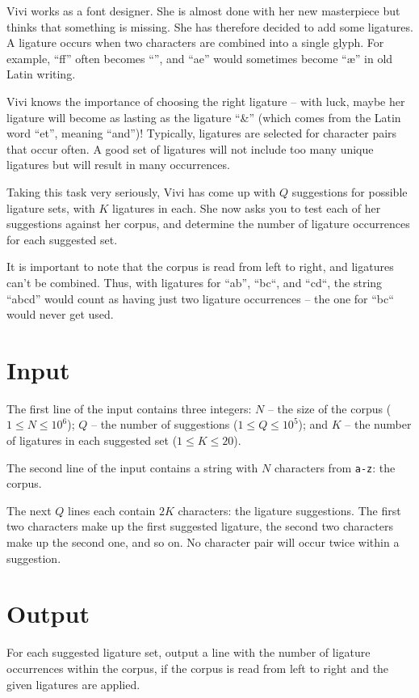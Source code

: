 Vivi works as a font designer.
She is almost done with her new masterpiece but thinks that something is missing.
She has therefore decided to add some ligatures.
A ligature occurs when two characters are combined into a single glyph.
For example, ``f{}f'' often becomes ``\fi'', and ``ae'' would sometimes become ``æ'' in old Latin writing.

Vivi knows the importance of choosing the right ligature -- with luck,
maybe her ligature will become as lasting as the ligature ``\&'' (which comes from the Latin word ``et'', meaning ``and'')!
Typically, ligatures are selected for character pairs that occur often.
A good set of ligatures will not include too many unique ligatures but will result in many occurrences.

Taking this task very seriously, Vivi has come up with $Q$ suggestions for possible ligature sets, with $K$ ligatures in each.
She now asks you to test each of her suggestions against her corpus, and determine the number of ligature occurrences for each suggested set.

It is important to note that the corpus is read from left to right, and ligatures can't be combined.
Thus, with ligatures for ``ab'', ``bc``, and ``cd``, the string ``abcd'' would count as having just two ligature occurrences -- the one for ``bc`` would never get used.

\section*{Input}
The first line of the input contains three integers:
  $N$ -- the size of the corpus ($1 \le N \le 10^6$);
  $Q$ -- the number of suggestions ($1 \le Q \le 10^5$); and
  $K$ -- the number of ligatures in each suggested set ($1 \le K \le 20$).

The second line of the input contains a string with $N$ characters from \texttt{a-z}: the corpus.

The next $Q$ lines each contain $2K$ characters: the ligature suggestions.
The first two characters make up the first suggested ligature, the second two characters make up the second one, and so on.
No character pair will occur twice within a suggestion.

\section*{Output}
For each suggested ligature set, output a line with the number of ligature occurrences within the corpus,
if the corpus is read from left to right and the given ligatures are applied.

